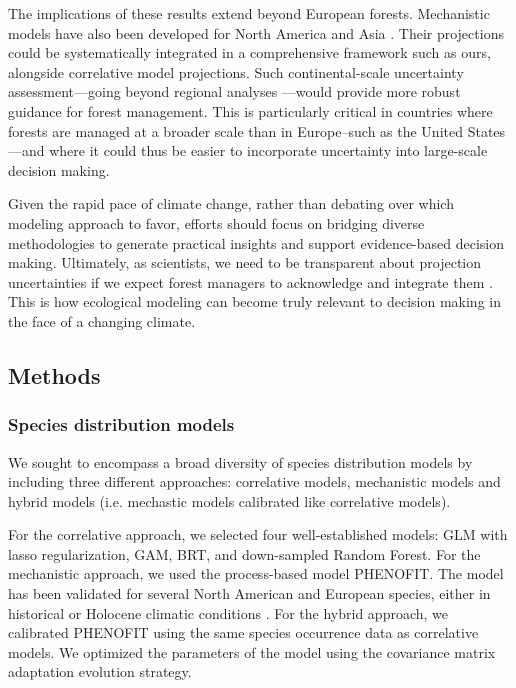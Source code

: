 \documentclass[11pt,letter]{article}
\begin{document}
The implications of these results extend beyond European forests. Mechanistic models have also been developed for North America and Asia \citep{Morin2007, Fang2022}. Their projections could be systematically integrated in a comprehensive framework such as ours, alongside correlative model projections. Such continental-scale uncertainty assessment---going beyond regional analyses \citep{Iverson2016}---would provide more robust guidance for forest management. This is particularly critical in countries where forests are managed at a broader scale than in Europe--such as the United States---and where it could thus be easier to incorporate uncertainty into large-scale decision making. 

Given the rapid pace of climate change, rather than debating over which modeling approach to favor, efforts should focus on bridging diverse methodologies to generate practical insights and support evidence-based decision making. Ultimately, as scientists, we need to be transparent about projection uncertainties if we expect forest managers to acknowledge and integrate them \citep{Saltelli2020}. This is how ecological modeling can become truly relevant to decision making in the face of a changing climate.


\subsection*{Methods}

\subsubsection*{Species distribution models}

We sought to encompass a broad diversity of species distribution models by including three different approaches: correlative models, mechanistic models and hybrid models (i.e. mechastic models calibrated like correlative models\citep{VanderMeersch2023}).

For the correlative approach, we selected four well-established models\citep{Valavi2022}: GLM with lasso regularization, GAM, BRT, and down-sampled Random Forest. For the mechanistic approach, we used the process-based model PHENOFIT. The model has been validated for several North American and European species, either in historical or Holocene climatic conditions \citep{Morin2007, Saltre2013, Duputie2015, Gauzere2020, VanderMeersch2024}. For the hybrid approach, we calibrated PHENOFIT using the same species occurrence data as correlative models\citep{VanderMeersch2023}. We optimized the parameters of the model using the covariance matrix adaptation evolution strategy\citep{Hansen2001}.
\end{document}
